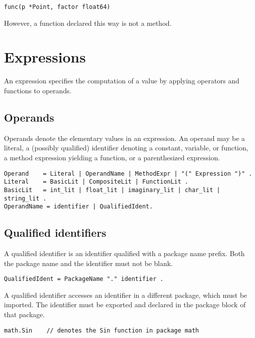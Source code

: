 {\begin{Verbatim}[frame=single]
func(p *Point, factor float64)
\end{Verbatim}

However, a function declared this way is not a method.

\section*{Expressions}

An expression specifies the computation of a value by applying operators
and functions to operands.

\subsection*{Operands}

Operands denote the elementary values in an expression. An operand may
be a literal, a (possibly qualified)
identifier denoting a constant,
variable, or
function, a
method expression yielding a function,
or a parenthesized expression.

\begin{Verbatim}[frame=single]
Operand    = Literal | OperandName | MethodExpr | "(" Expression ")" .
Literal    = BasicLit | CompositeLit | FunctionLit .
BasicLit   = int_lit | float_lit | imaginary_lit | char_lit | string_lit .
OperandName = identifier | QualifiedIdent.
\end{Verbatim}

\subsection*{Qualified identifiers}

A qualified identifier is an identifier qualified with a package name
prefix. Both the package name and the identifier must not be
blank.

\begin{Verbatim}[frame=single]
QualifiedIdent = PackageName "." identifier .
\end{Verbatim}

A qualified identifier accesses an identifier in a different package,
which must be imported. The identifier
must be exported and declared in the
package block of that package.

\begin{Verbatim}[frame=single]
math.Sin    // denotes the Sin function in package math
\end{Verbatim}

}
